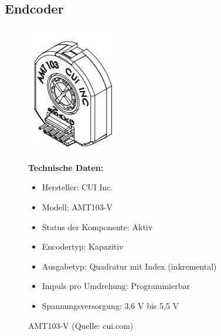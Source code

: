 \subsection{Endcoder}
\begin{figure}[htb]
	\centering
	\begin{minipage}{0.38\linewidth}
		\centering
		\includegraphics[scale=0.9]{images/Entcoder.jpg}
		\caption{AMT103-V  \newline (Quelle: cui.com)}
		\label{Endcoder}
	\end{minipage}
	\begin{minipage}[h]{0.6\textwidth}
		\textbf{Technische Daten:} 
		\begin{itemize} 
			\item Hersteller: CUI Inc.
			\item Modell:	AMT103-V
			\item Status der Komponente:	Aktiv
			\item Encodertyp:	Kapazitiv
			\item Ausgabetyp: Quadratur mit Index (inkremental)
			\item Impuls pro Umdrehung: Programmierbar
			\item Spannungsversorgung:	3,6 V bis 5,5 V
		\end{itemize}
	\end{minipage}
\end{figure}
